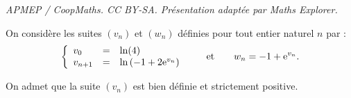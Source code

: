 \documentclass[10pt]{article}
\providecommand{\e}{{\mathrm{e}}}
\begin{document}
\noindent\textit{APMEP / CoopMaths. CC BY-SA. Présentation adaptée par Maths Explorer.}\par\medskip
\medskip


On considère les suites $(v_n)$ et $(w_n)$ définies pour tout entier naturel $n$
par :
\[ \left\{\begin{array}{l c l}
v_0 &=& \ln (4)\\
v_{n+1} &=& \ln \left(- 1 +2\e^{v_n}\right)
\end{array}\right. \qquad \text{et} \qquad w_n = - 1 + \e^{v_n}.\]

On admet que la suite $(v_n)$ est bien définie et strictement positive.
\end{document}

